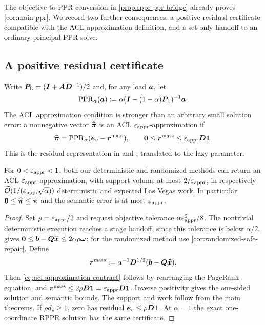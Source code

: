 The objective-to-PPR conversion in \cref{prop:rppr-ppr-bridge} already
proves \cref{cor:main-ppr}. We record two further consequences: a positive
residual certificate compatible with the ACL approximation definition, and
a set-only handoff to an ordinary principal PPR solve.

\subsection{A positive residual certificate}

Write $\bm{P}_{\mathrm{L}}=(\bm{I}+\bm{A}\bm{D}^{-1})/2$ and, for any load $\bm{a}$,
let
\begin{equation*}
 \operatorname{PPR}_\alpha(\bm{a})
   :=\alpha(\bm{I}-(1-\alpha)\bm{P}_{\mathrm{L}})^{-1}\bm{a}.
\end{equation*}
The ACL approximation condition is stronger than an arbitrary small
solution error: a nonnegative vector $\widehat{\bm{\pi}}$ is an ACL
$\varepsilon_{\mathrm{appr}}$-approximation if
\begin{equation}
 \widehat{\bm{\pi}}=\operatorname{PPR}_\alpha(\bm{e}_{v}-\bm{r}^{\mathrm{mass}}),
 \qquad \bm{0}\leq\bm{r}^{\mathrm{mass}}\leq\varepsilon_{\mathrm{appr}}\bm{D}\mathbf{1}.
 \label{eq:acl-approximation-contract}
\end{equation}
This is the residual representation in
\citet{andersen2007using} and \citet[Definition~1.1]{wei2026simple},
translated to the lazy parameter.

\begin{corollary}
\label{cor:acl-compatible-output}
For $0<\varepsilon_{\mathrm{appr}}<1$, both our deterministic and randomized methods can
return an ACL $\varepsilon_{\mathrm{appr}}$-approximation, with support volume at most
$2/\varepsilon_{\mathrm{appr}}$, in respectively
$\widetilde{\mathcal{O}}(1/(\varepsilon_{\mathrm{appr}}\sqrt\alpha))$ deterministic and expected Las Vegas
work. In particular $\bm{0}\leq\widehat{\bm{\pi}}\leq\bm{\pi}$ and the
semantic error is at most $\varepsilon_{\mathrm{appr}}$.
\end{corollary}
\begin{proof}
Set $\rho=\varepsilon_{\mathrm{appr}}/2$ and request objective tolerance
$\alpha\varepsilon_{\mathrm{appr}}^2/8$. The nontrivial deterministic execution reaches a
stage handoff, since this tolerance is below $\alpha/2$.
 gives
$\bm{0}\leq\bm{b}-\bm{Q}\widehat{\bm{x}}\leq2\alpha\rho\bm{\omega}$;
for the randomized method use \cref{cor:randomized-safe-repair}.
Define
\[
 \bm{r}^{\mathrm{mass}}:=\alpha^{-1}\bm{D}^{1/2}(\bm{b}-\bm{Q}\widehat{\bm{x}}).
\]
Then \cref{eq:acl-approximation-contract} follows by rearranging the
PageRank equation, and
$\bm{r}^{\mathrm{mass}}\leq2\rho\bm{D}\mathbf{1}=\varepsilon_{\mathrm{appr}}\bm{D}\mathbf{1}$.
Inverse positivity gives the one-sided solution and semantic bounds.
The support and work follow from the main theorems.
If $\rho d_v\geq1$, zero has residual $\bm{e}_{v}\leq\rho\bm{D}\mathbf{1}$.
At $\alpha=1$ the exact one-coordinate RPPR solution has the same certificate.
\end{proof}

